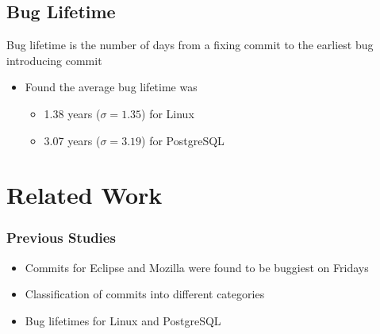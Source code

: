 \documentclass[aspectratio=43]{beamer}
\begin{document}
\subsection{Bug Lifetime}
\begin{frame}

  \begin{definition}
    Bug lifetime is the number of days from a fixing commit to the earliest bug
    introducing commit
  \end{definition}


  \begin{itemize}
    \item Found the average bug lifetime was

    \begin{itemize}
      \item 1.38 years ($\sigma = 1.35$) for Linux

      \item 3.07 years ($\sigma = 3.19$) for PostgreSQL
    \end{itemize}
  \end{itemize}
\end{frame}

\section{Related Work}
\begin{frame}
  \frametitle{Previous Studies}

  \begin{itemize}
    \item Commits for Eclipse and Mozilla were found to be buggiest on Fridays \cite[MSR]{sliwerski-msr-2005}

    \item Classification of commits into different categories \cite[MSR]{largeCommits}

    \item Bug lifetimes for Linux and PostgreSQL \cite[MSR]{deviant,2006-long}
  \end{itemize}
\end{frame}
\end{document}
